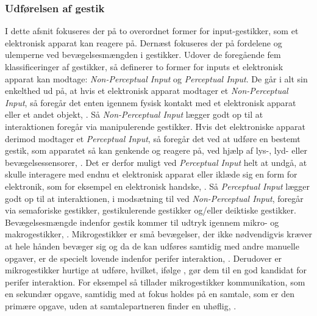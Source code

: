 \subsubsection{Udførelsen af gestik}
\label{UdfoerelseAfGestik}
%
I dette afsnit fokuseres der på to overordnet former for input-gestikker, som et elektronisk apparat kan reagere på. Dernæst fokuseres der på fordelene og ulemperne ved bevægelsesmængden i gestikker.\blankline
%
Udover de foregående fem klassificeringer af gestikker, så definerer \textcite[s. 9]{PDF:ATaxonomyOfGestures} to former for inputs et elektronisk apparat kan modtage: \textit{Non-Perceptual Input} og \textit{Perceptual Input}. De går i alt sin enkelthed ud på, at hvis et elektronisk apparat modtager et \textit{Non-Perceptual Input}, så foregår det enten igennem fysisk kontakt med et elektronisk apparat eller et andet objekt, \parencite[s. 10]{PDF:ATaxonomyOfGestures}. Så \textit{Non-Perceptual Input} lægger godt op til at interaktionen foregår via manipulerende gestikker. Hvis det elektroniske apparat derimod modtager et \textit{Perceptual Input}, så foregår det ved at udføre en bestemt gestik, som apparatet så kan genkende og reagere på, ved hjælp af lys-, lyd- eller bevægelsessensorer, \parencite[s. 12]{PDF:ATaxonomyOfGestures}. Det er derfor muligt ved \textit{Perceptual Input} helt at undgå, at skulle interagere med endnu et elektronisk apparat eller iklæde sig en form for elektronik, som for eksempel en elektronisk handske, \parencite[s. 12]{PDF:ATaxonomyOfGestures}. Så \textit{Perceptual Input} lægger godt op til at interaktionen, i modsætning til ved \textit{Non-Perceptual Input}, foregår via semaforiske gestikker, gestikulerende gestikker og/eller deiktiske gestikker.  \blankline
%
Bevægelsesmængde indenfor gestik kommer til udtryk igennem mikro- og makrogestikker, \parencite[s. 6]{PDF:UsabilityofMicroVsMacroGestures}. Mikrogestikker er små bevægelser, der ikke nødvendigvis kræver at hele hånden bevæger sig og da de kan udføres samtidig med andre manuelle opgaver, er de specielt lovende indenfor perifer interaktion, \parencite[s. 95]{PDF:PeripheralInteraction}. Derudover er mikrogestikker hurtige at udføre, hvilket, ifølge \textcite[s. 96]{PDF:PeripheralInteraction}, gør dem til en god kandidat for perifer interaktion. For eksempel så tillader mikrogestikker kommunikation, som en sekundær opgave, samtidig med at fokus holdes på en samtale, som er den primære opgave, uden at samtalepartneren finder en uhøflig, \parencite[s. 97]{PDF:PeripheralInteraction}.

